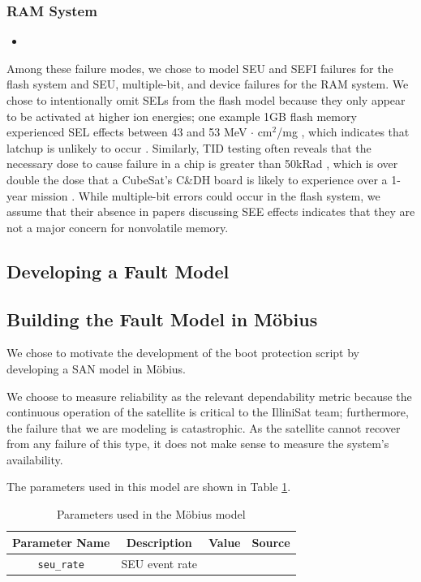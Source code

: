 \subsubsection{RAM System}\label{sec:rammodel}
\begin{itemize}
\item
\end{itemize}

Among these failure modes, we chose to model SEU and SEFI failures for the flash system and SEU, multiple-bit, and device failures for the RAM system.  We chose to intentionally omit SELs from the flash model because they only appear to be activated at higher ion energies; one example 1GB flash memory experienced SEL effects between 43 and 53 MeV $\cdot$ cm$^2$/mg \cite{Langley2004SEE}, which indicates that latchup is unlikely to occur \cite{Schwank2013Radiation}.  Similarly, TID testing often reveals that the necessary dose to cause failure in a chip is greater than 50kRad \cite{Oldham2008TID}, which is over double the dose that a CubeSat's C\&DH board is likely to experience over a 1-year mission \cite{Likar2010Novel}.  While multiple-bit errors could occur in the flash system, we assume that their absence in papers discussing SEE effects indicates that they are not a major concern for nonvolatile memory.

\subsection{Developing a Fault Model}\label{sec:developingmodel}



\subsection{Building the Fault Model in M\"obius}\label{sec:buildingmodel}

We chose to motivate the development of the boot protection script by developing a SAN model in M\"obius.

We choose to measure reliability as the relevant dependability metric because the continuous operation of the satellite is critical to the IlliniSat team; furthermore, the failure that we are modeling is catastrophic.  As the satellite cannot recover from any failure of this type, it does not make sense to measure the system's availability.

The parameters used in this model are shown in Table \ref{tab:parameters}.

\begin{table}[width = 0.5\textwidth]
\centering
\begin{tabular}{|c|c|c|c|}
\hline
{\bf Parameter Name} & {\bf Description} & {\bf Value} & {\bf Source}\\
\hline
\texttt{seu\_rate} & SEU event rate & & \\
\hline
\end{tabular}
\caption{Parameters used in the M\"obius model}
\label{tab:parameters}
\end{table}
